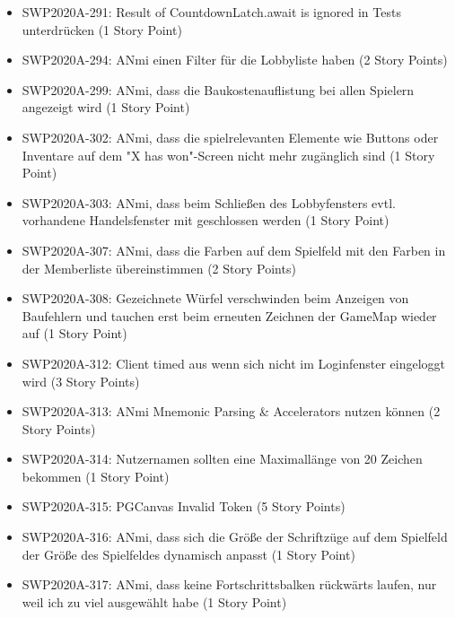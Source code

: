 \documentclass[12pt,a4paper, oneside]{article}
\begin{document}
\begin{itemize}
        \item SWP2020A-291: \glqq Result of CountdownLatch.await is ignored \grqq{} in Tests unterdrücken (1 Story Point)

        \item SWP2020A-294: ANmi einen Filter für die Lobbyliste haben (2 Story Points)

        \item SWP2020A-299: ANmi, dass die Baukostenauflistung bei allen Spielern angezeigt wird (1 Story Point)

        \item SWP2020A-302: ANmi, dass die spielrelevanten Elemente wie Buttons oder Inventare auf dem "X has won"-Screen nicht mehr zugänglich sind (1 Story Point)

        \item SWP2020A-303: ANmi, dass beim Schließen des Lobbyfensters evtl. vorhandene Handelsfenster mit geschlossen werden (1 Story Point)

        \item SWP2020A-307: ANmi, dass die Farben auf dem Spielfeld mit den Farben in der Memberliste übereinstimmen (2 Story Points)

        \item SWP2020A-308: Gezeichnete Würfel verschwinden beim Anzeigen von Baufehlern und tauchen erst beim erneuten Zeichnen der GameMap wieder auf (1 Story Point)

        \item SWP2020A-312: Client timed aus wenn sich nicht im Loginfenster eingeloggt wird (3 Story Points)

        \item SWP2020A-313: ANmi Mnemonic Parsing & Accelerators nutzen können (2 Story Points)

        \item SWP2020A-314: Nutzernamen sollten eine Maximallänge von 20 Zeichen bekommen (1 Story Point)

        \item SWP2020A-315: PGCanvas Invalid Token (5 Story Points)

        \item SWP2020A-316: ANmi, dass sich die Größe der Schriftzüge auf dem Spielfeld der Größe des Spielfeldes dynamisch anpasst (1 Story Point)

        \item SWP2020A-317: ANmi, dass keine Fortschrittsbalken rückwärts laufen, nur weil ich zu viel ausgewählt habe (1 Story Point)


\end{itemize}
\end{document}
